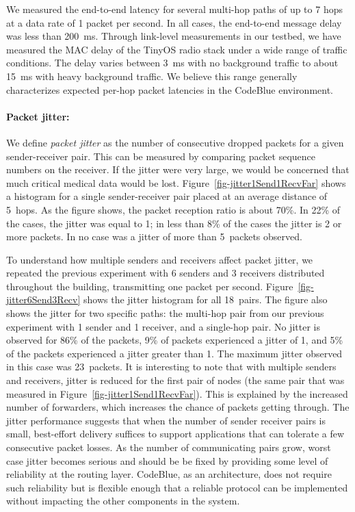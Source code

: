 We measured the end-to-end latency for several multi-hop paths of up
to 7 hops at a data rate of 1 packet per second. In all cases, the
end-to-end message delay was less than 200~ms. Through link-level
measurements in our testbed, we have measured the MAC delay of the
TinyOS radio stack under a wide range of traffic conditions. The
delay varies between 3~ms with no background traffic to about 15~ms
with heavy background traffic. We believe this range generally
characterizes expected per-hop packet latencies in the CodeBlue
environment.

\paragraph*{Packet jitter:}
We define {\em packet jitter} as the number of consecutive dropped
packets for a given sender-receiver pair. This can be measured by
comparing packet sequence numbers on the receiver. If the jitter were
very large, we would be concerned that much critical medical data
would be lost. Figure~\ref{fig-jitter1Send1RecvFar} shows a histogram
for a single sender-receiver pair placed at an average distance of
5~hops. As the figure shows, the packet reception ratio is about
70\%. In 22\% of the cases, the jitter was equal to 1; in less than
8\% of the cases the jitter is 2 or more packets. In no case was a
jitter of more than 5~packets observed.

To understand how multiple senders and receivers affect packet jitter,
we repeated the previous experiment with 6 senders and 3 receivers
distributed throughout the building, transmitting one packet per
second. Figure~\ref{fig-jitter6Send3Recv} shows the jitter histogram
for all 18~pairs. The figure also shows the jitter for two specific
paths: the multi-hop pair from our previous experiment with 1 sender
and 1 receiver, and a single-hop pair. No jitter is observed for 86\%
of the packets, 9\% of packets experienced a jitter of 1, and 5\% of
the packets experienced a jitter greater than 1. The maximum jitter
observed in this case was 23~packets. It is interesting to note that
with multiple senders and receivers, jitter is reduced for the first
pair of nodes (the same pair that was measured in
Figure~\ref{fig-jitter1Send1RecvFar}). This is explained by the
increased number of forwarders, which increases the chance of packets
getting through. The jitter performance suggests that when the number of
sender receiver pairs is small, best-effort delivery suffices to
support applications that can tolerate a few consecutive packet
losses. As the number of communicating pairs grow, worst case jitter
becomes serious and should be be fixed by providing some level of
reliability at the routing layer. CodeBlue, as an architecture, does
not require such reliability but is flexible enough that a reliable
protocol can be implemented without impacting the other components in
the system.



